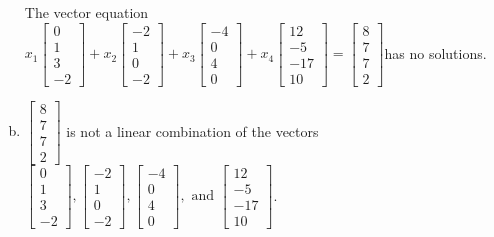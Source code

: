 \begin{exerciseAnswer}
\begin{enumerate}[(a)]
\begin{center}
\begin{minipage}{0.8\textwidth}
 The vector equation \( x_{1} \left[\begin{array}{c}
0 \\
1 \\
3 \\
-2
\end{array}\right] + x_{2} \left[\begin{array}{c}
-2 \\
1 \\
0 \\
-2
\end{array}\right] + x_{3} \left[\begin{array}{c}
-4 \\
0 \\
4 \\
0
\end{array}\right] + x_{4} \left[\begin{array}{c}
12 \\
-5 \\
-17 \\
10
\end{array}\right] = \left[\begin{array}{c}
8 \\
7 \\
7 \\
2
\end{array}\right] \)has no solutions.
\end{minipage}\end{center}
    
\item 

\( \left[\begin{array}{c}
8 \\
7 \\
7 \\
2
\end{array}\right] \) is not a linear combination of the vectors \( \left[\begin{array}{c}
0 \\
1 \\
3 \\
-2
\end{array}\right] , \left[\begin{array}{c}
-2 \\
1 \\
0 \\
-2
\end{array}\right] , \left[\begin{array}{c}
-4 \\
0 \\
4 \\
0
\end{array}\right] , \text{ and } \left[\begin{array}{c}
12 \\
-5 \\
-17 \\
10
\end{array}\right] \). 


\end{enumerate}
    
\end{exerciseAnswer}
    
